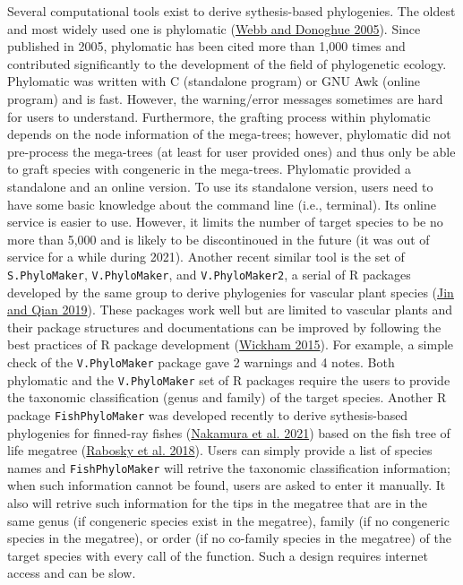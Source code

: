 \documentclass[
  12pt,
]{article}
\begin{document}
Several computational tools exist to derive sythesis-based phylogenies. The oldest and most widely used one is phylomatic (\protect\hyperlink{ref-webb2005phylomatic}{Webb and Donoghue 2005}). Since published in 2005, phylomatic has been cited more than 1,000 times and contributed significantly to the development of the field of phylogenetic ecology. Phylomatic was written with C (standalone program) or GNU Awk (online program) and is fast. However, the warning/error messages sometimes are hard for users to understand. Furthermore, the grafting process within phylomatic depends on the node information of the mega-trees; however, phylomatic did not pre-process the mega-trees (at least for user provided ones) and thus only be able to graft species with congeneric in the mega-trees. Phylomatic provided a standalone and an online version. To use its standalone version, users need to have some basic knowledge about the command line (i.e., terminal). Its online service is easier to use. However, it limits the number of target species to be no more than 5,000 and is likely to be discontinoued in the future (it was out of service for a while during 2021). Another recent similar tool is the set of \texttt{S.PhyloMaker}, \texttt{V.PhyloMaker}, and \texttt{V.PhyloMaker2}, a serial of R packages developed by the same group to derive phylogenies for vascular plant species (\protect\hyperlink{ref-jin2019v}{Jin and Qian 2019}). These packages work well but are limited to vascular plants and their package structures and documentations can be improved by following the best practices of R package development (\protect\hyperlink{ref-wickham2015r}{Wickham 2015}). For example, a simple check of the \texttt{V.PhyloMaker} package gave 2 warnings and 4 notes. Both phylomatic and the \texttt{V.PhyloMaker} set of R packages require the users to provide the taxonomic classification (genus and family) of the target species. Another R package \texttt{FishPhyloMaker} was developed recently to derive sythesis-based phylogenies for finned-ray fishes (\protect\hyperlink{ref-nakamura2021fishphylomaker}{Nakamura et al. 2021}) based on the fish tree of life megatree (\protect\hyperlink{ref-rabosky2018inverse}{Rabosky et al. 2018}). Users can simply provide a list of species names and \texttt{FishPhyloMaker} will retrive the taxonomic classification information; when such information cannot be found, users are asked to enter it manually. It also will retrive such information for the tips in the megatree that are in the same genus (if congeneric species exist in the megatree), family (if no congeneric species in the megatree), or order (if no co-family species in the megatree) of the target species with every call of the function. Such a design requires internet access and can be slow.
\end{document}
